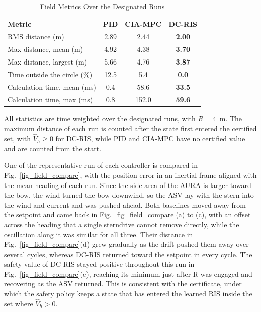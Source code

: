 \documentclass[lettersize,journal]{IEEEtran}
\newcommand{\gR}{\mathrm{R}}
\newcommand{\pid}{PID\xspace}
\newcommand{\ciampc}{CIA-MPC\xspace}
\newcommand{\dcris}{DC-RIS\xspace}
\begin{document}
\begin{table}[!t]
\renewcommand{\arraystretch}{1.35}
\caption{Field Metrics Over the Designated Runs}
\label{tab_field}
\centering
\footnotesize
\begin{tabular}{lccc}
\toprule
Metric & \pid & \ciampc & \textbf{\dcris} \\
\midrule
RMS distance (m) & 2.89 & 2.44 & \textbf{2.00} \\
Max distance, mean (m) & 4.92 & 4.38 & \textbf{3.70} \\
Max distance, largest (m) & 5.66 & 4.76 & \textbf{3.87} \\
Time outside the circle (\%) & 12.5 & 5.4 & \textbf{0.0} \\
Calculation time, mean (ms) & 0.4 & 58.6 & \textbf{33.5} \\
Calculation time, max (ms) & 0.8 & 152.0 & \textbf{59.6} \\
\bottomrule
\end{tabular}
\par\vspace{3pt}
\begin{minipage}{\columnwidth}\scriptsize\raggedright
All statistics are time weighted over the designated runs, with $R = 4$~m. The maximum distance of each run is counted after the state first entered the certified set, with $\hat V_h \ge 0$ for \dcris, while \pid and \ciampc have no certified value and are counted from the start.
\end{minipage}
\end{table}



One of the representative run of each controller is compared in Fig.~\ref{fig_field_compare}, with the position error in an inertial frame aligned with the mean heading of each run. Since the side area of the AURA is larger toward the bow, the wind turned the bow downwind, so the ASV lay with the stern into the wind and current and was pushed ahead. Both baselines moved away from the setpoint and came back in Fig.~\ref{fig_field_compare}(a) to (c), with an offset across the heading that a single sterndrive cannot remove directly, while the oscillation along it was similar for all three. Their distance in Fig.~\ref{fig_field_compare}(d) grew gradually as the drift pushed them away over several cycles, whereas \dcris returned toward the setpoint in every cycle. The safety value of \dcris stayed positive throughout this run in Fig.~\ref{fig_field_compare}(e), reaching its minimum just after $\gR$ was engaged and recovering as the ASV returned. This is consistent with the certificate, under which the safety policy keeps a state that has entered the learned RIS inside the set where $\hat V_h > 0$.
\end{document}
